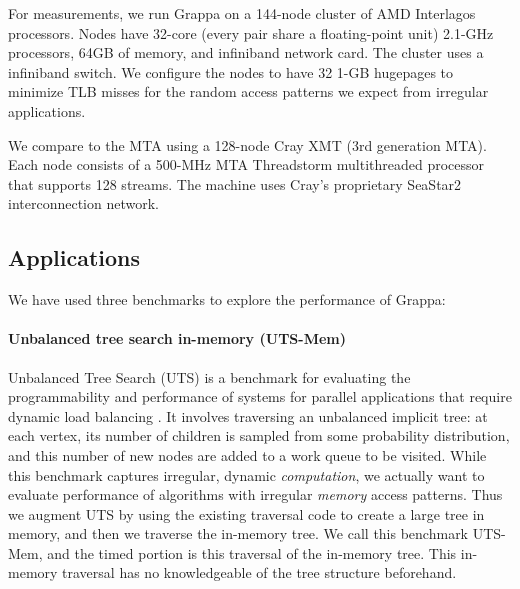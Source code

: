 For measurements, we run Grappa on a 144-node cluster of AMD Interlagos
processors. Nodes have 32-core (every pair share a floating-point unit)
2.1-GHz processors, 64GB of memory, and  infiniband network card.   The cluster uses a
 infiniband switch. We configure the nodes to have 32
1-GB hugepages to minimize TLB misses for the random access patterns we
expect from irregular applications.

We compare to the MTA using a 128-node Cray XMT (3rd generation MTA). 
Each node consists of a 500-MHz MTA Threadstorm multithreaded
processor that supports 128 streams. The machine uses Cray's proprietary
SeaStar2 interconnection network.

\subsection{Applications}

We have used three benchmarks to explore the performance of Grappa:


\paragraph{Unbalanced tree search in-memory (UTS-Mem)} Unbalanced Tree
Search (UTS) is a benchmark for evaluating the programmability and
performance of systems for parallel applications that require dynamic
load balancing \cite{Olivier:uts2006}. It involves traversing an
unbalanced implicit tree: at each vertex, its number of children is
sampled from some probability distribution, and this number of new nodes
are added to a work queue to be visited. While this benchmark captures
irregular, dynamic \emph{computation}, we actually want to evaluate
performance of algorithms with irregular \emph{memory} access patterns. 
Thus we augment UTS by using the existing traversal code to create a
large tree in memory, and then we traverse the in-memory tree. We call
this benchmark UTS-Mem, and the timed portion is this traversal of the
in-memory tree. This in-memory traversal has no knowledgeable of the
tree structure beforehand.

